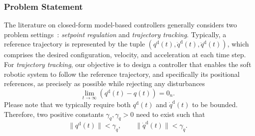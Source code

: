 \subsubsection{Problem Statement}
The literature on closed-form model-based controllers generally considers two problem settings~\citep{sciavicco2012modelling}: \emph{setpoint regulation} and \emph{trajectory tracking}. Typically, a reference trajectory is represented by the tuple $(q^\mathrm{d}(t), \dot{q}^\mathrm{d}(t), \ddot{q}^\mathrm{d}(t))$, which comprises the desired configuration, velocity, and acceleration at each time step. For \emph{trajectory tracking}, our objective is to design a controller that enables the soft robotic system to follow the reference trajectory, and specifically its positional references, as precisely as possible while rejecting any disturbances
\begin{equation}
    \lim_{t \to \infty} \left ( q^\mathrm{d}(t) - q(t) \right ) = 0_n.
\end{equation}
Please note that we typically require both $q^\mathrm{d}(t)$ and $\dot{q}^\mathrm{d}(t)$ to be bounded. Therefore, two positive constants $\gamma_q, \gamma_{\dot{q}} > 0$ need to exist such that~\citep{della2020model}
\begin{equation}
    \lVert q^\mathrm{d}(t) \rVert < \gamma_q,
    \qquad
    \lVert \dot{q}^\mathrm{d}(t) \rVert < \gamma_{\dot{q}}.
\end{equation}
